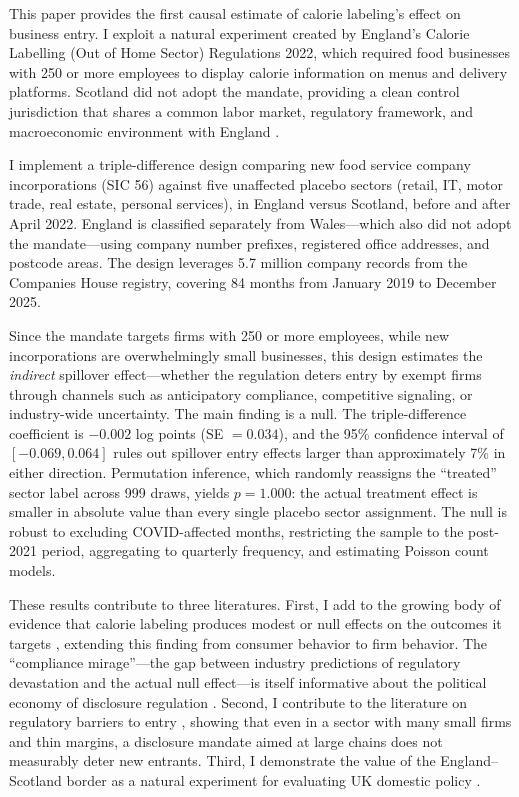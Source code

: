 \documentclass[12pt]{article}
\begin{document}
This paper provides the first causal estimate of calorie labeling's effect on business entry. I exploit a natural experiment created by England's Calorie Labelling (Out of Home Sector) Regulations 2022, which required food businesses with 250 or more employees to display calorie information on menus and delivery platforms. Scotland did not adopt the mandate, providing a clean control jurisdiction that shares a common labor market, regulatory framework, and macroeconomic environment with England \citep{bell2014}.

I implement a triple-difference design comparing new food service company incorporations (SIC 56) against five unaffected placebo sectors (retail, IT, motor trade, real estate, personal services), in England versus Scotland, before and after April 2022. England is classified separately from Wales---which also did not adopt the mandate---using company number prefixes, registered office addresses, and postcode areas. The design leverages 5.7 million company records from the Companies House registry, covering 84 months from January 2019 to December 2025.

Since the mandate targets firms with 250 or more employees, while new incorporations are overwhelmingly small businesses, this design estimates the \textit{indirect} spillover effect---whether the regulation deters entry by exempt firms through channels such as anticipatory compliance, competitive signaling, or industry-wide uncertainty. The main finding is a null. The triple-difference coefficient is $-0.002$ log points (SE $= 0.034$), and the 95\% confidence interval of $[-0.069, 0.064]$ rules out spillover entry effects larger than approximately 7\% in either direction. Permutation inference, which randomly reassigns the ``treated'' sector label across 999 draws, yields $p = 1.000$: the actual treatment effect is smaller in absolute value than every single placebo sector assignment. The null is robust to excluding COVID-affected months, restricting the sample to the post-2021 period, aggregating to quarterly frequency, and estimating Poisson count models.

These results contribute to three literatures. First, I add to the growing body of evidence that calorie labeling produces modest or null effects on the outcomes it targets \citep{bollinger2011, long2015}, extending this finding from consumer behavior to firm behavior. The ``compliance mirage''---the gap between industry predictions of regulatory devastation and the actual null effect---is itself informative about the political economy of disclosure regulation \citep{sunstein2020}. Second, I contribute to the literature on regulatory barriers to entry \citep{djankov2002, bailey2019}, showing that even in a sector with many small firms and thin margins, a disclosure mandate aimed at large chains does not measurably deter new entrants. Third, I demonstrate the value of the England--Scotland border as a natural experiment for evaluating UK domestic policy \citep{bell2014, mcvittie2019}.
\end{document}
